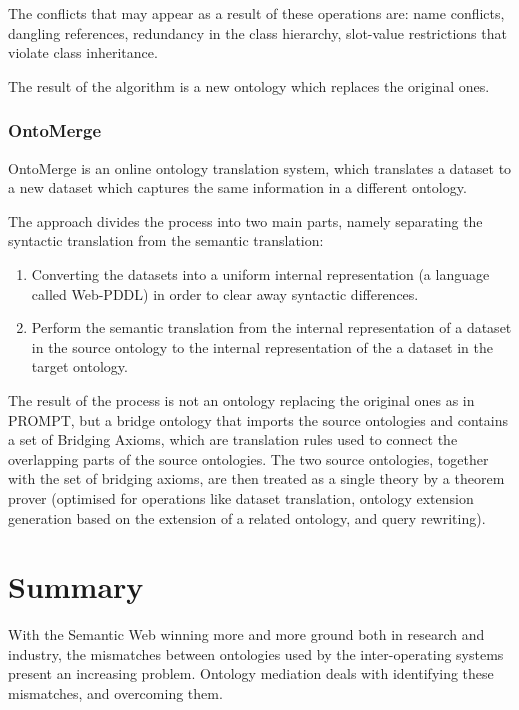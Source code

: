 \documentclass{fast_latex}
\begin{document}
The conflicts that may appear as a result of these operations are: name
conflicts, dangling references, redundancy in the class hierarchy,
slot-value restrictions that violate class inheritance. 

The result of the algorithm is a new ontology which replaces the
original ones. 

\subsubsection{OntoMerge}
OntoMerge \cite{dou2002ontology_translation} is an online ontology translation system,
which translates a dataset to a new dataset which captures the same
information in a different ontology. 

The approach divides the process into two main parts, namely separating
the syntactic translation from the semantic translation: 

\begin{enumerate}
\item Converting the datasets into a uniform internal representation (a
language called Web-PDDL) in order to clear away syntactic differences.

\item Perform the semantic translation from the internal representation
of a dataset in the source ontology to the internal representation of
the a dataset in the target ontology. 
\end{enumerate}
The result of the process is not an ontology replacing the original ones
as in PROMPT, but a bridge ontology that imports the source ontologies
and contains a set of Bridging Axioms, which are translation rules used
to connect the overlapping parts of the source ontologies. The two
source ontologies, together with the set of bridging axioms, are then
treated as a single theory by a theorem prover (optimised for
operations like dataset translation, ontology extension generation
based on the extension of a related ontology, and query rewriting). 

\section{Summary}
\label{sec:summary}
With the Semantic Web winning more and more ground both in research and
industry, the mismatches between ontologies used by the inter-operating
systems present an increasing problem. Ontology mediation deals with
identifying these mismatches, and overcoming them. 
\end{document}

